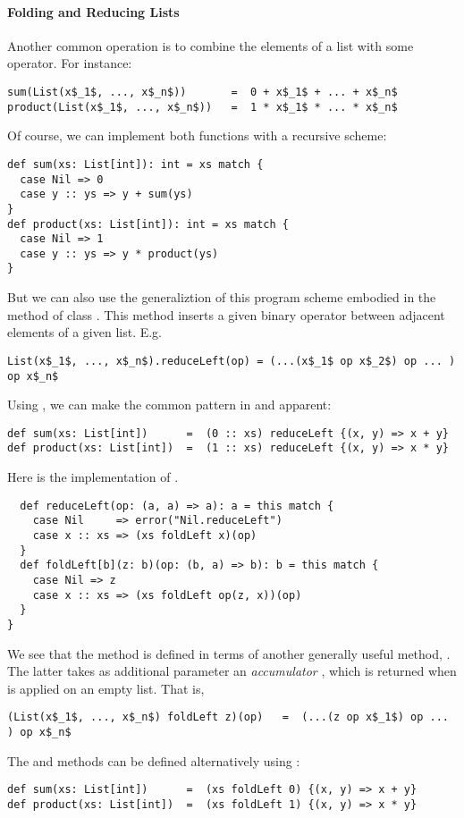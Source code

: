 \documentclass[a4paper,12pt,twoside,titlepage]{book}
\begin{document}
\paragraph{Folding and Reducing Lists}
Another common operation is to combine the elements of a list with
some operator.  For instance:
\begin{lstlisting}
sum(List(x$_1$, ..., x$_n$))       =  0 + x$_1$ + ... + x$_n$
product(List(x$_1$, ..., x$_n$))   =  1 * x$_1$ * ... * x$_n$
\end{lstlisting}
Of course, we can implement both functions with a
recursive scheme:
\begin{lstlisting}
def sum(xs: List[int]): int = xs match {
  case Nil => 0
  case y :: ys => y + sum(ys)
}
def product(xs: List[int]): int = xs match {
  case Nil => 1
  case y :: ys => y * product(ys)
}
\end{lstlisting}
But we can also use the generaliztion of this program scheme embodied
in the  method of class .  This method
inserts a given binary operator between adjacent elements of a given list.
E.g.\ 
\begin{lstlisting}
List(x$_1$, ..., x$_n$).reduceLeft(op) = (...(x$_1$ op x$_2$) op ... ) op x$_n$
\end{lstlisting}
Using , we can make the common pattern
in  and  apparent:
\begin{lstlisting}
def sum(xs: List[int])      =  (0 :: xs) reduceLeft {(x, y) => x + y}
def product(xs: List[int])  =  (1 :: xs) reduceLeft {(x, y) => x * y}
\end{lstlisting}
Here is the implementation of .
\begin{lstlisting}
  def reduceLeft(op: (a, a) => a): a = this match {
    case Nil     => error("Nil.reduceLeft")
    case x :: xs => (xs foldLeft x)(op)
  }
  def foldLeft[b](z: b)(op: (b, a) => b): b = this match {
    case Nil => z
    case x :: xs => (xs foldLeft op(z, x))(op)
  }
}
\end{lstlisting}
We see that the  method is defined in terms of
another generally useful method, .  The latter takes as
additional parameter an {\em accumulator} \code{z}, which is returned
when \code{foldLeft} is applied on an empty list. That is,
\begin{lstlisting}
(List(x$_1$, ..., x$_n$) foldLeft z)(op)   =  (...(z op x$_1$) op ... ) op x$_n$
\end{lstlisting}
The  and  methods can be defined alternatively
using \code{foldLeft}:
\begin{lstlisting}
def sum(xs: List[int])      =  (xs foldLeft 0) {(x, y) => x + y}
def product(xs: List[int])  =  (xs foldLeft 1) {(x, y) => x * y}
\end{lstlisting}
\end{document}
